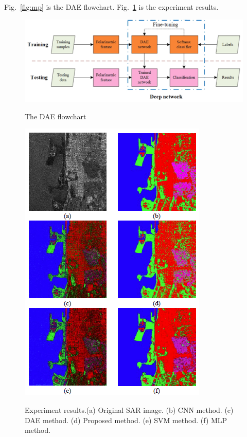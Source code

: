 \documentclass[]{IEEEtran}
\begin{document}
	Fig.~\ref{fig:mp} is the DAE flowchart. Fig.~\ref{fig:ss} is the experiment results.

\newpage
\begin{figure}[!hbt]
		\vspace{0.2cm}
		\begin{center}
			\includegraphics[width=\columnwidth]{DAE}
			\caption{The DAE flowchart}
			\label{fig:mp}
		    \vspace{0.2cm}
			\includegraphics[width=\columnwidth]{out}
			\caption{Experiment results.(a) Original SAR image. (b)
				CNN method. (c) DAE method. (d) Proposed method. (e) SVM method. (f)	MLP method.}
			\label{fig:ss}
		\end{center}
	\end{figure}

\end{document}
